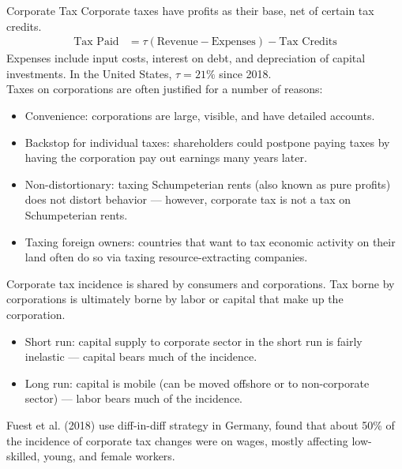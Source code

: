 \documentclass[10pt]{extarticle}
\begin{document}
  \begin{problem}{Corporate Tax}
    Corporate taxes have profits as their base, net of certain tax credits.
    \begin{align*}
      \text{Tax Paid} &= \tau(\text{Revenue} - \text{Expenses}) - \text{Tax Credits}
    \end{align*}
    Expenses include input costs, interest on debt, and depreciation of capital investments. In the United States, $\tau = 21\%$ since 2018.\\

    Taxes on corporations are often justified for a number of reasons:
    \begin{itemize}
      \item Convenience: corporations are large, visible, and have detailed accounts.
      \item Backstop for individual taxes: shareholders could postpone paying taxes by having the corporation pay out earnings many years later.
      \item Non-distortionary: taxing Schumpeterian rents (also known as pure profits) does not distort behavior --- however, corporate tax is not a tax on Schumpeterian rents.
      \item Taxing foreign owners: countries that want to tax economic activity on their land often do so via taxing resource-extracting companies.
    \end{itemize}
    Corporate tax incidence is shared by consumers and corporations. Tax borne by corporations is ultimately borne by labor or capital that make up the corporation.
    \begin{itemize}
      \item Short run: capital supply to corporate sector in the short run is fairly inelastic --- capital bears much of the incidence.
      \item Long run: capital is mobile (can be moved offshore or to non-corporate sector) --- labor bears much of the incidence.
    \end{itemize}
    Fuest et al. (2018) use diff-in-diff strategy in Germany, found that about 50\% of the incidence of corporate tax changes were on wages, mostly affecting low-skilled, young, and female workers.
  \end{problem}
\end{document}
